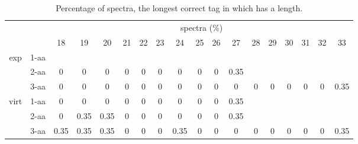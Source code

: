 \documentclass{article}
\begin{document}
\begin{table}[h]\tiny
\vspace{3mm}
{\centering
\begin{center}
\begin{tabular}{|c|l|c|c|c|c|c|c|c|c|c|c|c|c|c|c|c|c|}
  \hline
  \multicolumn{2}{|c|}{ } & \multicolumn{ 16 }{|c|}{ spectra (\%)} \\
  \cline{3- 18}
  \multicolumn{2}{|c|}{ }  & 18 & 19 & 20 & 21 & 22 & 23 & 24 & 25 & 26 & 27 & 28 & 29 & 30 & 31 & 32 & 33\\
  \hline
  \multirow{3}{*}{exp}
&  1-aa  &  &  &  &  &  &  &  &  &  &  &  &  &  &  &  & \\&  2-aa  & 0 & 0 & 0 & 0 & 0 & 0 & 0 & 0 & 0 & 0.35 &  &  &  &  &  & \\&  3-aa  & 0 & 0 & 0 & 0 & 0 & 0 & 0 & 0 & 0 & 0 & 0 & 0 & 0 & 0 & 0 & 0.35\\ \hline
  \multirow{3}{*}{virt} 
&  1-aa  & 0 & 0 & 0 & 0 & 0 & 0 & 0 & 0 & 0 & 0.35 &  &  &  &  &  & \\&  2-aa  & 0 & 0.35 & 0.35 & 0 & 0 & 0 & 0 & 0 & 0 & 0.35 &  &  &  &  &  & \\&  3-aa  & 0.35 & 0.35 & 0.35 & 0 & 0 & 0 & 0.35 & 0 & 0 & 0 & 0 & 0 & 0 & 0 & 0 & 0.35\\ \hline
\end{tabular}
\end{center}
\par}
\centering
\caption{ Percentage of spectra, the longest correct tag in which has a length.}
\vspace{3mm}
\label{table:table8}
\end{table}
\end{document}
